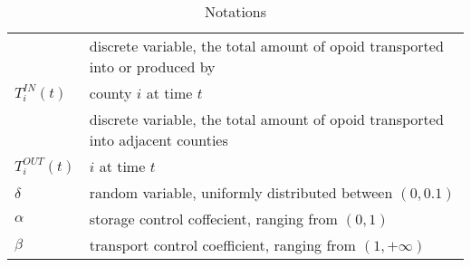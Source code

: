 \begin{table}[H]
\begin{tabular}{|l|l|}
 & discrete variable, the total amount of opoid transported into or produced by\\ $T_i^{IN}(t)$ & county $i$ at time $t$ \\ \hline
 & discrete variable, the total amount of opoid transported into adjacent counties\\$T_i^{OUT}(t)$ & $i$ at time $t$ \\ \hline
 $\delta$ & random variable, uniformly distributed between $(0,0.1)$\\ \hline
 $\alpha$ & storage control coffecient, ranging from $(0,1)$\\ \hline 
 $\beta$ & transport control coefficient, ranging from $(1, +\infty)$\\ \hline
\end{tabular}
\caption{Notations}
\end{table}